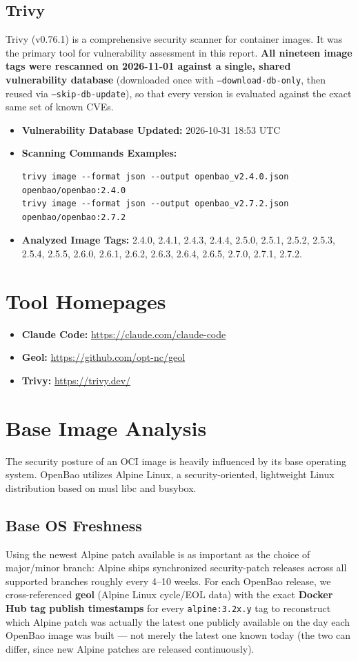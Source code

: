 \documentclass{article}
\begin{document}
\subsection{Trivy}
Trivy (v0.76.1) is a comprehensive security scanner for container images. It was the primary tool for vulnerability assessment in this report. \textbf{All nineteen image tags were rescanned on 2026-11-01 against a single, shared vulnerability database} (downloaded once with \texttt{--download-db-only}, then reused via \texttt{--skip-db-update}), so that every version is evaluated against the exact same set of known CVEs.
\begin{itemize}
    \item \textbf{Vulnerability Database Updated:} 2026-10-31 18:53 UTC
    \item \textbf{Scanning Commands Examples:}
    {\small
\begin{verbatim}
trivy image --format json --output openbao_v2.4.0.json openbao/openbao:2.4.0
trivy image --format json --output openbao_v2.7.2.json openbao/openbao:2.7.2
\end{verbatim}
    }
    \item \textbf{Analyzed Image Tags:} 2.4.0, 2.4.1, 2.4.3, 2.4.4, 2.5.0, 2.5.1, 2.5.2, 2.5.3, 2.5.4, 2.5.5, 2.6.0, 2.6.1, 2.6.2, 2.6.3, 2.6.4, 2.6.5, 2.7.0, 2.7.1, 2.7.2.
\end{itemize}

\section{Tool Homepages}
\begin{itemize}
    \item \textbf{Claude Code:} \url{https://claude.com/claude-code}
    \item \textbf{Geol:} \url{https://github.com/opt-nc/geol}
    \item \textbf{Trivy:} \url{https://trivy.dev/}
\end{itemize}

\section{Base Image Analysis}
The security posture of an OCI image is heavily influenced by its base operating system. OpenBao utilizes Alpine Linux, a security-oriented, lightweight Linux distribution based on musl libc and busybox.

\subsection{Base OS Freshness}
Using the newest Alpine patch available is as important as the choice of major/minor branch: Alpine ships synchronized security-patch releases across all supported branches roughly every 4--10 weeks. For each OpenBao release, we cross-referenced \textbf{geol} (Alpine Linux cycle/EOL data) with the exact \textbf{Docker Hub tag publish timestamps} for every \texttt{alpine:3.2x.y} tag to reconstruct which Alpine patch was actually the latest one publicly available on the day each OpenBao image was built --- not merely the latest one known today (the two can differ, since new Alpine patches are released continuously).
\end{document}
